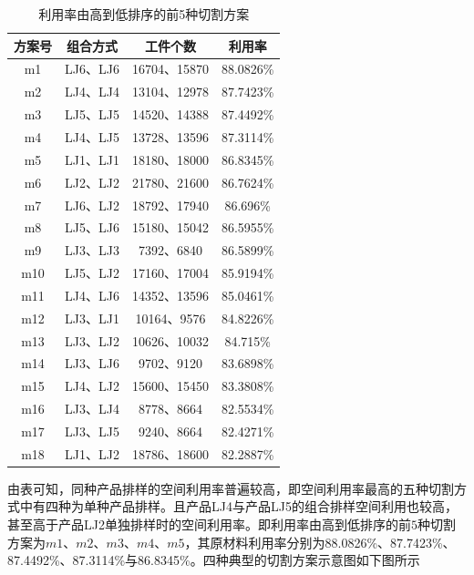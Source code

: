 \documentclass{whutmod}
\begin{document}
			\begin{table}[H]
			\centering		
			\caption{利用率由高到低排序的前5种切割方案}\label{zhuanssssasgzai}
			\begin{tabular}{cccc}
			\toprule[2pt]
				\multicolumn{1}{m{2cm}}{\centering 方案号}
				& \multicolumn{1}{m{3cm}}{\centering 组合方式}
				& \multicolumn{1}{m{4cm}}{\centering 工件个数}
				& \multicolumn{1}{m{4cm}}{\centering 利用率}
				\\
				\midrule[1pt]
				m1 &  LJ6、LJ6&16704、15870&88.0826\%\\ 
				m2 &  LJ4、LJ4&13104、12978&87.7423\%\\ 
				m3 &  LJ5、LJ5&14520、14388&87.4492\%\\ 
				m4 &  LJ4、LJ5&13728、13596&87.3114\%\\ 
				m5 &  LJ1、LJ1&18180、18000&86.8345\%\\ 
				m6 &  LJ2、LJ2&21780、21600&86.7624\%\\ 
				m7 &  LJ6、LJ2&18792、17940&86.696\%\\ 
				m8 &  LJ5、LJ6&15180、15042&86.5955\%\\ 
				m9 &  LJ3、LJ3&7392、6840&86.5899\%\\ 
				m10 &  LJ5、LJ2&17160、17004&85.9194\%\\ 
				m11 &  LJ4、LJ6&14352、13596&85.0461\%\\ 
				m12 &  LJ3、LJ1&10164、9576&84.8226\%\\ 
				m13 &  LJ3、LJ2&10626、10032&84.715\%\\ 
				m14 &  LJ3、LJ6&9702、9120&83.6898\%\\ 
				m15 &  LJ4、LJ2&15600、15450&83.3808\%\\ 
				m16 &  LJ3、LJ4&8778、8664&82.5534\%\\ 
				m17 &  LJ3、LJ5&9240、8664&82.4271\%\\ 
				m18 &  LJ1、LJ2&18786、18600&82.2887\%\\ 
			\bottomrule[2pt]	
			\end{tabular}
			\end{table}
		由表可知，同种产品排样的空间利用率普遍较高，即空间利用率最高的五种切割方式中有四种为单种产品排样。且产品LJ4与产品LJ5的组合排样空间利用也较高，甚至高于产品LJ2单独排样时的空间利用率。即利用率由高到低排序的前$5$种切割方案为$m1$、$m2$、$m3$、$m4$、$m5$，其原材料利用率分别为88.0826\%、87.7423\%、87.4492\%、87.3114\%与86.8345\%。四种典型的切割方案示意图如下图所示
		
\end{document}
